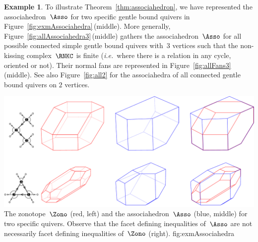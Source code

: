 \documentclass{memo-l}
\theoremstyle{definition}
\newtheorem{example}[theorem]{Example}
\newcommand{\fref}[1]{Figure~\ref{#1}} %
\newcommand{\ie}{\textit{i.e.}~} %
\begin{document}
\begin{example}
To illustrate Theorem~\ref{thm:associahedron}, we have represented the associahedron~$\Asso$ for two specific gentle bound quivers in \fref{fig:exmAssociahedra}\,(middle).
More generally, \fref{fig:allAssociahedra3}\,(middle) gathers the associahedron~$\Asso$ for all possible connected simple gentle bound quivers with~$3$ vertices such that the non-kissing complex~$\RNKC$ is finite (\ie where there is a relation in any cycle, oriented or not).
Their normal fans are represented in \fref{fig:allFans3}\,(middle).
See also \fref{fig:all2} for the associahedra of all connected gentle bound quivers on $2$ vertices.

\captionsetup{width=1.5\textwidth}
{\includegraphics[scale=.5]{exmAssociahedra}}
{The zonotope~$\Zono$ (red, left) and the associahedron~$\Asso$ (blue, middle) for two specific quivers. Observe that the facet defining inequalities of~$\Asso$ are not necessarily facet defining inequalities of~$\Zono$ (right).}
{fig:exmAssociahedra}
\captionsetup{width=\textwidth}

\end{example}
\end{document}
